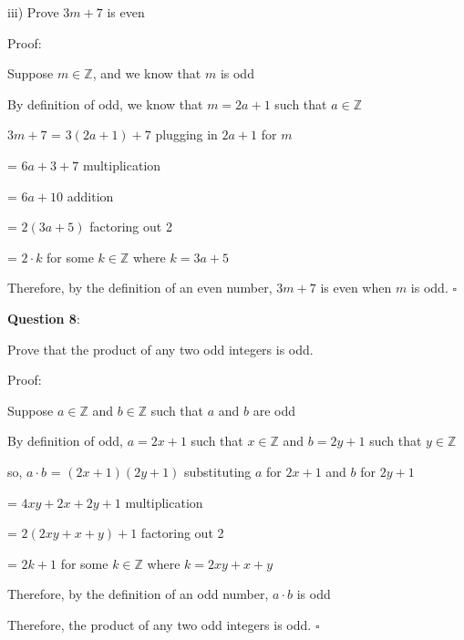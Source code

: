 \documentclass{article} %
\newcommand{\question}[2][]{\begin{flushleft}
        \textbf{Question #1}: \textit{#2}

\end{flushleft}}
\begin{document}
    iii) Prove $3m + 7$ is even

    \vspace*{0.3cm}
    Proof:

    Suppose $m \in \mathbb{Z}$, and we know that $m$ is odd
    
    By definition of odd, we know that $m = 2a+1$ such that $a \in \mathbb{Z}$

    $3m + 7$ = $3(2a + 1) + 7$ \tabto*{5cm}plugging in $2a + 1$ for $m$

    \tabto*{1.75cm} = $6a + 3 + 7$ \tabto*{5cm}multiplication

    \tabto*{1.75cm} = $6a + 10$ \tabto*{5cm}addition

    \tabto*{1.75cm} = $2(3a + 5)$ \tabto*{5cm}factoring out 2

    \tabto*{1.75cm} = $2\cdot k$ for some $k \in \mathbb{Z}$ where $k = 3a + 5$

    Therefore, by the definition of an even number, $3m + 7$ is even when $m$ is odd. $\square$

    \newpage

                                                                    
                                                                    

    \question[8]{}

    Prove that the product of any two odd integers is odd.

    Proof:

    Suppose $a \in \mathbb{Z}$ and $b \in \mathbb{Z}$ such that $a$ and $b$ are odd

    By definition of odd, $a = 2x + 1$ such that $x \in \mathbb{Z}$ and $b = 2y + 1$ such that $y \in \mathbb{Z}$

    so, $a \cdot b$ = $(2x + 1)(2y + 1)$ substituting $a$ for $2x + 1$ and $b$ for $2y + 1$

    \tabto*{1.78cm} = $4xy + 2x + 2y + 1$ multiplication

    \tabto*{1.78cm} = $2(2xy + x + y) + 1$ factoring out 2

    \tabto*{1.78cm} = $2k + 1$ for some $k \in \mathbb{Z}$ where $k = 2xy + x + y$

    Therefore, by the definition of an odd number, $a \cdot b$ is odd

    Therefore, the product of any two odd integers is odd. $\square$
    
\end{document}
